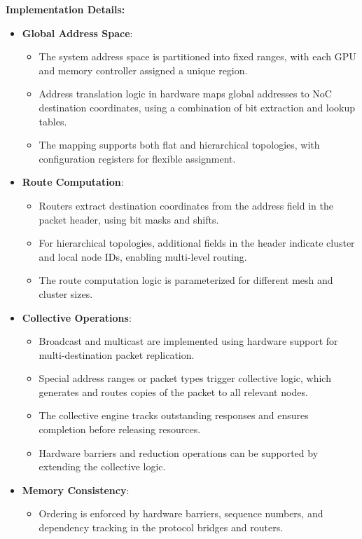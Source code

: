 \documentclass[11pt,a4paper]{article}
\begin{document}
\textbf{Implementation Details:}
\begin{itemize}
    \item \textbf{Global Address Space}:
    \begin{itemize}
        \item The system address space is partitioned into fixed ranges, with each GPU and memory controller assigned a unique region.
        \item Address translation logic in hardware maps global addresses to NoC destination coordinates, using a combination of bit extraction and lookup tables.
        \item The mapping supports both flat and hierarchical topologies, with configuration registers for flexible assignment.
    \end{itemize}
    \item \textbf{Route Computation}:
    \begin{itemize}
        \item Routers extract destination coordinates from the address field in the packet header, using bit masks and shifts.
        \item For hierarchical topologies, additional fields in the header indicate cluster and local node IDs, enabling multi-level routing.
        \item The route computation logic is parameterized for different mesh and cluster sizes.
    \end{itemize}
    \item \textbf{Collective Operations}:
    \begin{itemize}
        \item Broadcast and multicast are implemented using hardware support for multi-destination packet replication.
        \item Special address ranges or packet types trigger collective logic, which generates and routes copies of the packet to all relevant nodes.
        \item The collective engine tracks outstanding responses and ensures completion before releasing resources.
        \item Hardware barriers and reduction operations can be supported by extending the collective logic.
    \end{itemize}
    \item \textbf{Memory Consistency}:
    \begin{itemize}
        \item Ordering is enforced by hardware barriers, sequence numbers, and dependency tracking in the protocol bridges and routers.

\end{itemize}
\end{itemize}
\end{document}

